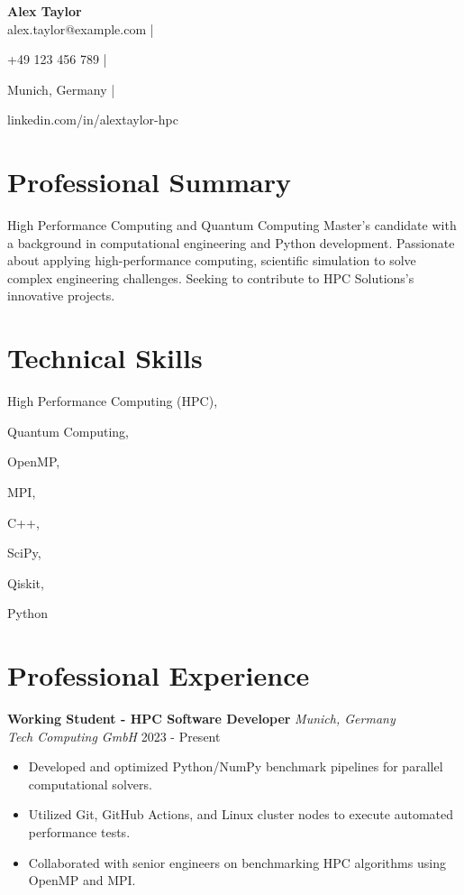 \documentclass[11pt,a4paper]{article}
\newcommand{\jobtitle}[4]{
    \textbf{#1} \hfill \textit{#2}\\
    \textit{#3} \hfill #4
}
\begin{document}
\begin{center}
    {\LARGE\bfseries Alex Taylor}\\[6pt]
    
    alex.taylor@example.com | 
    
    +49 123 456 789 | 
    
    Munich, Germany | 
    
    linkedin.com/in/alextaylor-hpc
    
\end{center}

\section{Professional Summary}
High Performance Computing and Quantum Computing Master's candidate with a background in computational engineering and Python development. Passionate about applying high-performance computing, scientific simulation to solve complex engineering challenges. Seeking to contribute to HPC Solutions's innovative projects.

\section{Technical Skills}

High Performance Computing (HPC), 

Quantum Computing, 

OpenMP, 

MPI, 

C++, 

SciPy, 

Qiskit, 

Python


\section{Professional Experience}

\jobtitle{ Working Student - HPC Software Developer }{ Munich, Germany }{ Tech Computing GmbH }{ 2023 - Present }
\begin{itemize}[leftmargin=*,nosep,topsep=3pt]
    
    \item Developed and optimized Python/NumPy benchmark pipelines for parallel computational solvers.
    
    \item Utilized Git, GitHub Actions, and Linux cluster nodes to execute automated performance tests.
    
    \item Collaborated with senior engineers on benchmarking HPC algorithms using OpenMP and MPI.
    
\end{itemize}
\end{document}

